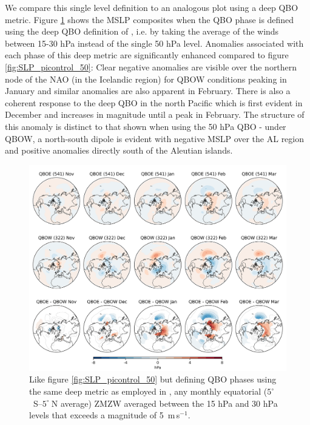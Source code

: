 We compare this single level definition to an analogous plot using a deep QBO metric. Figure \ref{fig:SLP_picontrol_deep} shows the MSLP composites when the QBO phase is defined using the deep QBO definition of \cite{andrewsObserved2019d}, i.e. by taking the average of the winds between 15-30 hPa instead of the single 50 hPa level. Anomalies associated with each phase of this deep metric are significantly enhanced compared to figure \ref{fig:SLP_picontrol_50}: Clear negative anomalies are visible over the northern node of the NAO (in the Icelandic region) for QBOW conditions peaking in January and similar anomalies are also apparent in February. There is also a coherent response to the deep QBO in the north Pacific which is first evident in December and increases in magnitude until a peak in February. The structure of this anomaly is distinct to that shown when using the 50 hPa QBO - under QBOW, a north-south dipole is evident with negative MSLP over the AL region and positive anomalies directly south of the Aleutian islands.

\begin{figure}[h!]
\begin{center}
\noindent\includegraphics[width = 0.8\linewidth]{Figures/Figures-deepQBO/LAGGED_SLP_composites_individual_months_QBO_phases_U_picontrol_deephPa_1thresh.png}
\caption[MSLP composites under deep QBO phases in the pi-control simulation]{Like figure \ref{fig:SLP_picontrol_50} but defining QBO phases using the same deep metric as employed in \cite{andrewsObserved2019d}, any monthly equatorial ($5^{\circ}$\ S--$5^{\circ}\ $N average) ZMZW averaged between the 15 hPa and 30 hPa levels that exceeds a magnitude of 5\ m\,s$^{-1}$.}
\label{fig:SLP_picontrol_deep}
\end{center}
\end{figure}


